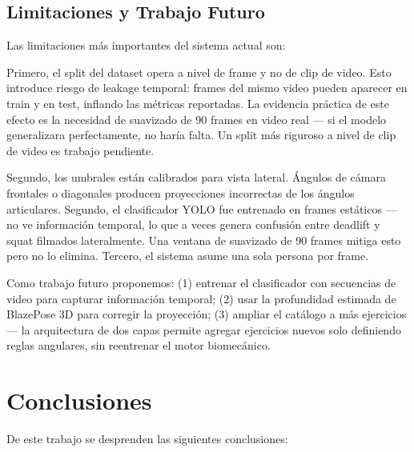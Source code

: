 \documentclass[conference]{IEEEtran}
\begin{document}
\subsection{Limitaciones y Trabajo Futuro}

Las limitaciones más importantes del sistema actual son:

Primero, el split del dataset opera a nivel de frame y no de clip de video. Esto introduce riesgo de leakage temporal: frames del mismo video pueden aparecer en train y en test, inflando las métricas reportadas. La evidencia práctica de este efecto es la necesidad de suavizado de 90 frames en video real — si el modelo generalizara perfectamente, no haría falta. Un split más riguroso a nivel de clip de video es trabajo pendiente.

Segundo, los umbrales están calibrados para vista lateral. Ángulos de cámara frontales o diagonales producen proyecciones incorrectas de los ángulos articulares. Segundo, el clasificador YOLO fue entrenado en frames estáticos — no ve información temporal, lo que a veces genera confusión entre deadlift y squat filmados lateralmente. Una ventana de suavizado de 90 frames mitiga esto pero no lo elimina. Tercero, el sistema asume una sola persona por frame.

Como trabajo futuro proponemos: (1) entrenar el clasificador con secuencias de video para capturar información temporal; (2) usar la profundidad estimada de BlazePose 3D para corregir la proyección; (3) ampliar el catálogo a más ejercicios — la arquitectura de dos capas permite agregar ejercicios nuevos solo definiendo reglas angulares, sin reentrenar el motor biomecánico.

\section{Conclusiones}

De este trabajo se desprenden las siguientes conclusiones:
\end{document}
